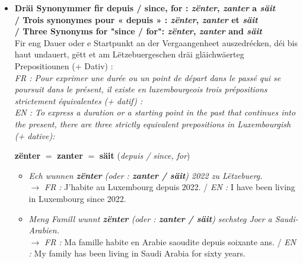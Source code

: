 \begin{itemize}
\begin{itemize}
        $\rightarrow$ \textit{FR :} Je veux apprendre le luxembourgeois (verbe modal en position 2, infinitif à la fin). \\
        $\rightarrow$ \textit{EN :} I want to learn Luxembourgish (modal verb in position 2, infinitive at the end). \\
        $\bullet$ \textit{... \textbf{well} ech Lëtzebuergesch léiere \textbf{wëll}.} (Konjunktioun \textit{well} + konjugéiert Verb \textit{wëll} ganz um Enn !) \\
        $\rightarrow$ \textit{FR :} ... parce que je veux apprendre le luxembourgeois (conjonction \textit{well} + verbe conjugué à la fin). \\
        $\rightarrow$ \textit{EN :} ... because I want to learn Luxembourgish (conjunction \textit{well} + conjugated verb at the end).
    \end{itemize}

    \vspace{0.3em}

    \item \textbf{Dräi Synonymmer fir \flqq depuis / since, for\frqq{} : \textit{zënter}, \textit{zanter} a \textit{säit} \\
    / Trois synonymes pour « depuis » : \textit{zënter}, \textit{zanter} et \textit{säit} \\
    / Three Synonyms for "since / for": \textit{zënter}, \textit{zanter} and \textit{säit}} \\
    Fir eng Dauer oder e Startpunkt an der Vergaangenheet auszedrécken, déi bis haut undauert, gëtt et am Lëtzebuergeschen dräi gläichwäerteg Prepositiounen (+ Dativ) : \\
    \textit{FR : Pour exprimer une durée ou un point de départ dans le passé qui se poursuit dans le présent, il existe en luxembourgeois trois prépositions strictement équivalentes (+ datif) :} \\
    \textit{EN : To express a duration or a starting point in the past that continues into the present, there are three strictly equivalent prepositions in Luxembourgish (+ dative):}
    \begin{center}
        \textbf{zënter} \quad $=$ \quad \textbf{zanter} \quad $=$ \quad \textbf{säit} \quad (\textit{depuis / since, for})
    \end{center}
    \begin{itemize}
        \item \textit{Ech wunnen \textbf{zënter} (oder : \textbf{zanter / säit}) 2022 zu Lëtzebuerg.} \\
        $\rightarrow$ \textit{FR :} J'habite au Luxembourg depuis 2022. / \textit{EN :} I have been living in Luxembourg since 2022.
        \item \textit{Meng Famill wunnt \textbf{zënter} (oder : \textbf{zanter / säit}) sechsteg Joer a Saudi-Arabien.} \\
        $\rightarrow$ \textit{FR :} Ma famille habite en Arabie saoudite depuis soixante ans. / \textit{EN :} My family has been living in Saudi Arabia for sixty years.
    \end{itemize}
\end{itemize}

